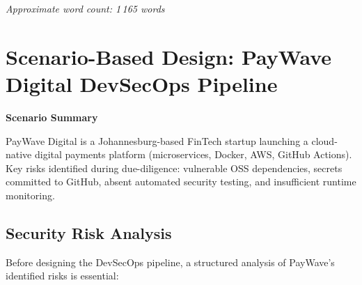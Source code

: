\documentclass[12pt,a4paper]{article}
\newenvironment{secbox}[1]{%
  \begin{framed}
  \noindent\textbf{\color{phaseblue}#1}\par\medskip
}{%
  \end{framed}
}
\newenvironment{notebox}{%
  \begin{framed}
  \noindent
}{%
  \end{framed}
}
\begin{document}
\vspace{0.5em}
\begin{notebox}
\textit{Approximate word count: 1\,165 words}
\end{notebox}

\newpage

\section{Scenario-Based Design: PayWave Digital DevSecOps Pipeline}

\begin{secbox}{Scenario Summary}
PayWave Digital is a Johannesburg-based FinTech startup launching a cloud-native digital
payments platform (microservices, Docker, AWS, GitHub Actions). Key risks identified during
due-diligence: vulnerable OSS dependencies, secrets committed to GitHub, absent automated
security testing, and insufficient runtime monitoring.
\end{secbox}

\subsection{Security Risk Analysis}

Before designing the DevSecOps pipeline, a structured analysis of PayWave's identified
risks is essential:
\end{document}
